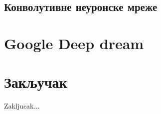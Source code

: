 \documentclass[a4paper]{article}
\begin{document}
\subsection{Конволутивне неуронске мреже}

\section{Google Deep dream}

\section{Закључак}
Zakljucak...

\appendix


\end{document}
